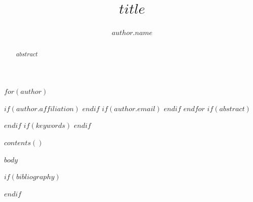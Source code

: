 \documentclass[$for(classoption)$$classoption$$sep$,$endfor$]{acmart}
\begin{document}
\title{$title$}
$for(author)$
\author{$author.name$}
$if(author.affiliation)$
$endif$
$if(author.email)$
$endif$
$endfor$
$if(abstract)$
\begin{abstract}
$abstract$
\end{abstract}
$endif$
$if(keywords)$
$endif$
\maketitle
$contents()$

$body$

$if(bibliography)$


$endif$
\end{document}
